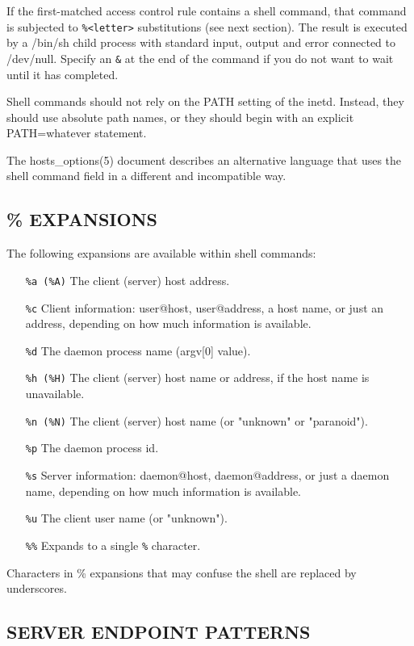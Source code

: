 \documentclass[11pt,twoside,onecolumn]{book}
\begin{document}
If the first-matched access control rule contains a shell command, that
command is subjected to {\tt \%<letter>} substitutions (see next section).
The result is executed by a /bin/sh child process with standard
input, output and error connected to /dev/null.  Specify an {\tt \&}
at the end of the command if you do not want to wait until it has
completed.

Shell commands should not rely on the PATH setting of the inetd.
Instead, they should use absolute path names, or they should begin with
an explicit PATH=whatever statement.

The hosts\_options(5) document describes an alternative language
that uses the shell command field in a different and incompatible way.

\subsection*{\% EXPANSIONS}

The following expansions are available within shell commands:

\begin{itemize}

\item[\tt \%a (\%A)] The client (server) host address.
\item[\tt \%c] Client information: user@host, user@address, a host name, or just an
address, depending on how much information is available.
\item[\tt \%d] The daemon process name (argv[0] value).
\item[\tt \%h (\%H)]
The client (server) host name or address, if the host name is
unavailable.
\item[\tt \%n (\%N)] The client (server) host name (or "unknown" or "paranoid").
\item[\tt \%p] The daemon process id.
\item[\tt \%s]  Server information: daemon@host, daemon@address, or just a daemon name,
depending on how much information is available.
\item [\tt \%u] The client user name (or "unknown").
\item [\tt \%\%] Expands to a single {\tt \%} character.

\end{itemize}

Characters in \% expansions that may confuse the shell are replaced by
underscores.

\subsection*{SERVER ENDPOINT PATTERNS}
\end{document}
